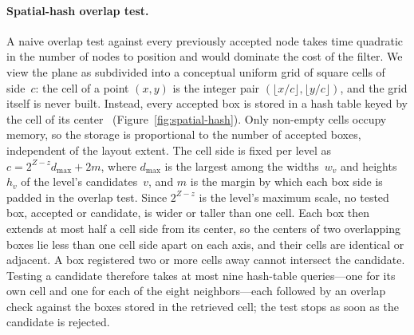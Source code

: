 \documentclass[review]{vgtc}          %
\begin{document}
\paragraph{Spatial-hash overlap test.}
A naive overlap test against every previously accepted node takes
time quadratic in the number of nodes to position and would
dominate the cost of the filter. We view the plane as
subdivided into a conceptual uniform grid of square cells of
side~$c$: the cell of a point $(x,y)$ is the integer pair
$(\lfloor x/c\rfloor, \lfloor y/c\rfloor)$, and the grid itself is
never built. Instead, every accepted box is stored in a hash table
keyed by the cell of its center~\cite{teschner2003optimized}
(Figure~\ref{fig:spatial-hash}). Only non-empty cells occupy memory,
so the storage is proportional to the number of accepted boxes,
independent of the layout extent. The cell side is fixed per level as
$c = 2^{Z-z} d_{\max} + 2m$, where $d_{\max}$ is the largest among
the widths~$w_v$ and heights~$h_v$ of the level's candidates~$v$,
and $m$ is the margin by which each box side is padded in the
overlap test. Since $2^{Z-z}$ is the level's maximum
scale, no tested box, accepted or candidate, is wider or taller than
one cell. Each
box then extends at most half a cell side from its center, so the
centers of two overlapping boxes lie less than one cell side apart on
each axis, and their cells are identical or adjacent. A box
registered two or more cells away cannot intersect the candidate. Testing a candidate therefore takes at most nine
hash-table queries---one for its own cell and one for each of the
eight neighbors---each followed by an overlap check against the
boxes stored in the retrieved cell; the test stops as soon as the
candidate is rejected.
\end{document}
